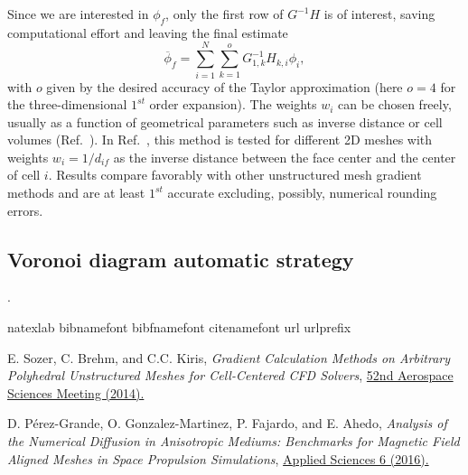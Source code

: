 \documentclass[]{article}
\newcommand{\Eq}[1]{\begin{equation}#1\end{equation}}
\begin{document}
Since we are interested in $\phi_f$, only the first row of $G^{-1}H$ is of interest, saving computational effort and leaving the final estimate
\Eq{\overline{\phi}_f  = \sum_{i = 1}^N\sum_{k = 1}^o G^{-1}_{1,k} H_{k,i} \phi_i,}
with $o$ given by the desired accuracy of the Taylor approximation (here $o=4$ for the three-dimensional $1^{st}$ order expansion). The weights $w_i$ can be chosen freely, usually as a function of geometrical parameters such as inverse distance or cell volumes (Ref.~\cite{Grande2016}). In Ref.~\cite{Sozer2014}, this method is tested for different 2D meshes with weights $w_i = 1/d_{if}$ as the inverse distance between the face center and the center of cell $i$. Results compare favorably with other unstructured mesh gradient methods and are at least $1^{st}$ accurate excluding, possibly, numerical rounding errors. 
\subsection*{Voronoi diagram automatic strategy}
.
\begin{thebibliography}{19}

\expandafter\ifx\csname natexlab\endcsname\relax\def\natexlab#1{#1}\fi
\expandafter\ifx\csname bibnamefont\endcsname\relax
  \def\bibnamefont#1{#1}\fi
\expandafter\ifx\csname bibfnamefont\endcsname\relax
  \def\bibfnamefont#1{#1}\fi
\expandafter\ifx\csname citenamefont\endcsname\relax
  \def\citenamefont#1{#1}\fi
\expandafter\ifx\csname url\endcsname\relax
  \def\url#1{\texttt{#1}}\fi
\expandafter\ifx\csname urlprefix\endcsname\relax\def\urlprefix{URL }\fi
\providecommand{\bibinfo}[2]{#2}
\providecommand{\eprint}[2][]{\url{#2}}


\bibinfo{author}{\bibfnamefont{E. Sozer}},
\bibinfo{author}{\bibfnamefont{C. Brehm}},
\bibnamefont{and}
\bibinfo{author}{\bibfnamefont{C.C. Kiris}},
\emph{\bibinfo{title}{Gradient Calculation Methods on Arbitrary Polyhedral Unstructured Meshes for Cell-Centered CFD Solvers}},
\href{http://dx.doi.org/10.2514/6.2014-1440}{
\bibinfo{journal}{52nd Aerospace Sciences Meeting} 
(\bibinfo{year}{2014}).}


\bibinfo{author}{\bibfnamefont{D. P{\'{e}}rez-Grande}},
\bibinfo{author}{\bibfnamefont{O. Gonzalez-Martinez}},
\bibinfo{author}{\bibfnamefont{P. Fajardo}},
\bibnamefont{and}
\bibinfo{author}{\bibfnamefont{E. Ahedo}},
\emph{\bibinfo{title}{Analysis of the Numerical Diffusion in Anisotropic Mediums: Benchmarks for Magnetic Field Aligned Meshes in Space Propulsion Simulations}},
\href{https://doi.org/10.3390/app6110354}{
\bibinfo{journal}{Applied Sciences}
\bibinfo{volume}{6}
(\bibinfo{year}{2016}).}





\end{thebibliography}
\end{document}
